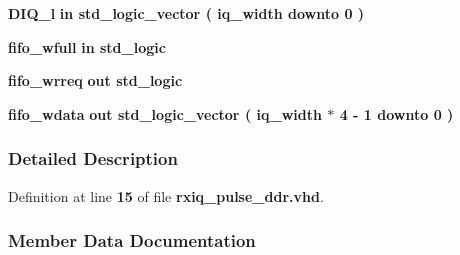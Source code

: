 \begin{DoxyCompactItemize}
{\bf D\+I\+Q\+\_\+l}  {\bfseries {\bfseries \textcolor{keywordflow}{in}\textcolor{vhdlchar}{ }}} {\bfseries \textcolor{comment}{std\+\_\+logic\+\_\+vector}\textcolor{vhdlchar}{ }\textcolor{vhdlchar}{(}\textcolor{vhdlchar}{ }\textcolor{vhdlchar}{ }\textcolor{vhdlchar}{ }\textcolor{vhdlchar}{ }{\bfseries {\bf iq\+\_\+width}} \textcolor{vhdlchar}{ }\textcolor{keywordflow}{downto}\textcolor{vhdlchar}{ }\textcolor{vhdlchar}{ } \textcolor{vhdldigit}{0} \textcolor{vhdlchar}{ }\textcolor{vhdlchar}{)}\textcolor{vhdlchar}{ }} 
\item 
{\bf fifo\+\_\+wfull}  {\bfseries {\bfseries \textcolor{keywordflow}{in}\textcolor{vhdlchar}{ }}} {\bfseries \textcolor{comment}{std\+\_\+logic}\textcolor{vhdlchar}{ }} 
\item 
{\bf fifo\+\_\+wrreq}  {\bfseries {\bfseries \textcolor{keywordflow}{out}\textcolor{vhdlchar}{ }}} {\bfseries \textcolor{comment}{std\+\_\+logic}\textcolor{vhdlchar}{ }} 
\item 
{\bf fifo\+\_\+wdata}  {\bfseries {\bfseries \textcolor{keywordflow}{out}\textcolor{vhdlchar}{ }}} {\bfseries \textcolor{comment}{std\+\_\+logic\+\_\+vector}\textcolor{vhdlchar}{ }\textcolor{vhdlchar}{(}\textcolor{vhdlchar}{ }\textcolor{vhdlchar}{ }\textcolor{vhdlchar}{ }\textcolor{vhdlchar}{ }{\bfseries {\bf iq\+\_\+width}} \textcolor{vhdlchar}{$\ast$}\textcolor{vhdlchar}{ } \textcolor{vhdldigit}{4} \textcolor{vhdlchar}{-\/}\textcolor{vhdlchar}{ } \textcolor{vhdldigit}{1} \textcolor{vhdlchar}{ }\textcolor{keywordflow}{downto}\textcolor{vhdlchar}{ }\textcolor{vhdlchar}{ } \textcolor{vhdldigit}{0} \textcolor{vhdlchar}{ }\textcolor{vhdlchar}{)}\textcolor{vhdlchar}{ }} 
\end{DoxyCompactItemize}


\subsubsection{Detailed Description}


Definition at line {\bf 15} of file {\bf rxiq\+\_\+pulse\+\_\+ddr.\+vhd}.



\subsubsection{Member Data Documentation}
